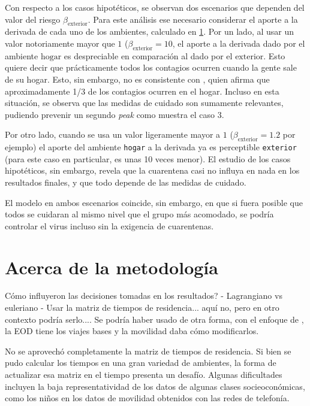 Con respecto a los casos hipotéticos, se observan dos escenarios que dependen del valor del riesgo \(\beta_{\text{exterior}}\). Para este análisis ese necesario considerar el aporte a la derivada de cada uno de los ambientes, calculado en \ref{}. 
Por un lado, al usar un valor notoriamente mayor que \(1\) (\(\beta_{\text{exterior}} = 10\), el aporte a la derivada dado por el ambiente \(\text{hogar}\) es despreciable en comparación al dado por el \(\text{exterior}\). Esto quiere decir que prácticamente todos los contagios ocurren cuando la gente sale de su hogar. Esto, sin embargo, no es consistente con \cite{Ferguson2020}, quien afirma que aproximadamente 1/3 de los contagios ocurren en el hogar. Incluso en esta situación, se observa que las medidas de cuidado son sumamente relevantes, pudiendo prevenir un segundo \textit{peak} como muestra el caso 3.

Por otro lado, cuando se usa un valor ligeramente mayor a \(1\) (\(\beta_{\text{exterior}} = 1.2\) por ejemplo) el aporte del ambiente \texttt{hogar} a la derivada ya es perceptible \texttt{exterior} (para este caso en particular, es unas 10 veces menor). El estudio de los casos hipotéticos, sin embargo, revela que la cuarentena casi no influya en nada en los resultados finales, y que todo depende de las medidas de cuidado.

El modelo en ambos escenarios coincide, sin embargo, en que si fuera posible que todos se cuidaran al mismo nivel que el grupo más acomodado, se podría controlar el virus incluso sin la exigencia de cuarentenas.

\section{Acerca de la metodología}

  

Cómo influyeron las decisiones tomadas en los resultados? 
- Lagrangiano vs euleriano 
- Usar la matriz de tiempos de residencia... aquí no, pero en otro contexto podría serlo.... Se podría haber usado de otra forma, con el enfoque de \cite{Chang2021}, la EOD tiene los viajes bases y la movilidad daba cómo modificarlos.

No se aprovechó completamente la matriz de tiempos de residencia. Si bien se pudo calcular los tiempos en una gran variedad de ambientes, la forma de actualizar esa matriz en el tiempo presenta un desafío. Algunas dificultades incluyen la baja representatividad de los datos de algunas clases socieoconómicas, como los niños en los datos de movilidad obtenidos con las redes de telefonía. 

